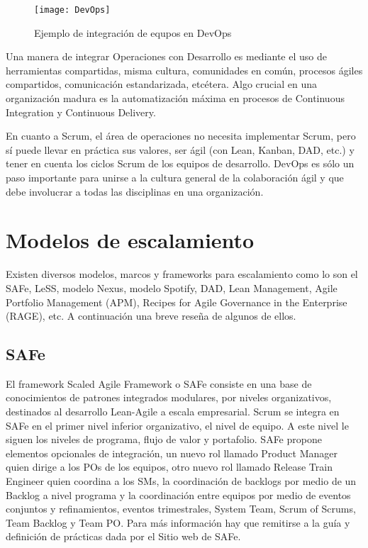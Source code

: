 \begin{figure}[h]
  \centering
  \texttt{[image: DevOps]}
  \caption{Ejemplo de integración de equpos en DevOps}
  \centering
  \label{fig:DevOps} %
\end{figure}

Una manera de integrar Operaciones con Desarrollo es mediante el uso de herramientas compartidas, misma cultura, comunidades en común, procesos ágiles compartidos, comunicación estandarizada, etcétera. Algo crucial en una organización madura es la automatización máxima en procesos de Continuous Integration y Continuous Delivery.

En cuanto a Scrum, el área de operaciones no necesita implementar Scrum, pero sí puede llevar en práctica sus valores, ser ágil (con Lean, Kanban, DAD, etc.) y tener en cuenta los ciclos Scrum de los equipos de desarrollo. DevOps es sólo un paso importante para unirse a la cultura general de la colaboración ágil y que debe involucrar a todas las disciplinas en una organización. 


\section{Modelos de escalamiento}

Existen diversos modelos, marcos y frameworks para escalamiento como lo son el SAFe, LeSS, modelo Nexus, modelo Spotify, DAD, Lean Management, Agile Portfolio Management (APM), Recipes for Agile Governance in the Enterprise (RAGE), etc. A continuación una breve reseña de algunos de ellos.

\subsection{SAFe}

El framework Scaled Agile Framework o SAFe consiste en una base de conocimientos de patrones integrados modulares, por niveles organizativos, destinados al desarrollo Lean-Agile a escala empresarial. Scrum se integra en SAFe en el primer nivel inferior organizativo, el nivel de equipo. A este nivel le siguen los niveles de programa, flujo de valor y portafolio. SAFe propone elementos opcionales de integración, un nuevo rol llamado Product Manager quien dirige a los POs de los equipos, otro nuevo rol llamado Release Train Engineer quien coordina a los SMs, la coordinación de backlogs por medio de un Backlog a nivel programa y la coordinación entre equipos por medio de eventos conjuntos y refinamientos, eventos trimestrales, System Team, Scrum of Scrums, Team Backlog y Team PO. Para más información hay que remitirse a la guía y definición de prácticas dada por el Sitio web de SAFe.

